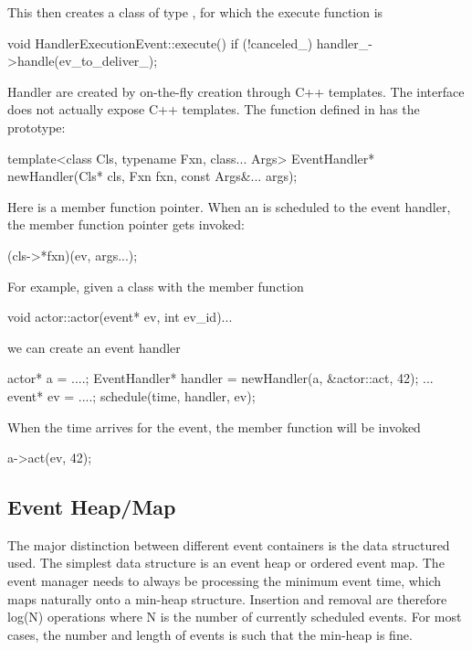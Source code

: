 This then creates a class of type , for which the execute function is

\begin{CppCode}
void HandlerExecutionEvent::execute()
{
  if (!canceled_) {
    handler_->handle(ev_to_deliver_);
  }
}
\end{CppCode}

Handler are created by on-the-fly creation through C++ templates.
The interface does not actually expose C++ templates.
The function  defined in  has the prototype:

\begin{CppCode}
template<class Cls, typename Fxn, class... Args>
EventHandler* 
newHandler(Cls* cls, Fxn fxn, const Args&... args);
\end{CppCode}

Here  is a member function pointer.
When an  is scheduled to the event handler, the member function pointer gets invoked:

\begin{CppCode}
(cls->*fxn)(ev, args...);
\end{CppCode}

For example, given a class  with the member function 

\begin{CppCode}
void actor::actor(event* ev, int ev_id){...}
\end{CppCode}
we can create an event handler

\begin{CppCode}
actor* a = ....;
EventHandler* handler = newHandler(a, &actor::act, 42);
...
event* ev = ....;
schedule(time, handler, ev);
\end{CppCode}
When the time arrives for the event, the member function will be invoked

\begin{CppCode}
a->act(ev, 42);
\end{CppCode}


\subsection{Event Heap/Map}
\label{subsec:eventHeap}
The major distinction between different event containers is the data structured used.
The simplest data structure is an event heap or ordered event map.
The event manager needs to always be processing the minimum event time, which maps naturally onto a min-heap structure.
Insertion and removal are therefore log(N) operations where N is the number of currently scheduled events.
For most cases, the number and length of events is such that the min-heap is fine.

